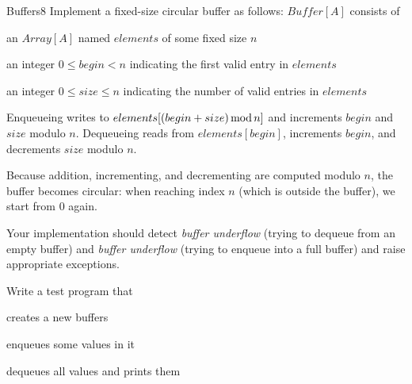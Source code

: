 \documentclass[a4paper]{article}
\begin{document}
\begin{problem}{Buffers}{8}
Implement a fixed-size circular buffer as follows: $\mathit{Buffer}[A]$ consists of
\begin{compactitem}
 \item an $Array[A]$ named $elements$ of some fixed size $n$
 \item an integer $0\leq begin <n$ indicating the first valid entry in $elements$
 \item an integer $0\leq size\leq n$ indicating the number of valid entries in $elements$
\end{compactitem}
Enqueueing writes to $elements[(begin+size)\mathop{\mathrm{mod}} n]$ and increments $begin$ and $size$ modulo $n$.
Dequeueing reads from $elements[begin]$, increments $begin$, and decrements $size$ modulo $n$.

Because addition, incrementing, and decrementing are computed modulo $n$, the buffer becomes circular: when reaching index $n$ (which is outside the buffer), we start from $0$ again.

Your implementation should detect \emph{buffer underflow} (trying to dequeue from an empty buffer) and \emph{buffer underflow} (trying to enqueue into a full buffer) and raise appropriate exceptions.

Write a test program that
\begin{compactitem}
 \item creates a new buffers
 \item enqueues some values in it
 \item dequeues all values and prints them
\end{compactitem}
\end{problem}
\end{document}
